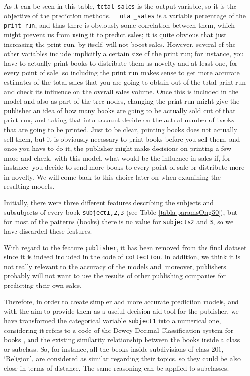 \documentclass[a4paper,10pt,twocolumn,preprint,3p]{elsarticle}
\begin{document}
As it can be seen in this table, \texttt{total\_sales} is the output
variable, so it is the objective of the prediction methods. {\tt
 total\_sales} is a variable percentage of the {\tt print\_run}, and
thus there is obviously some correlation between them, which might
prevent us from using it to predict sales; it is quite obvious that
just increasing the print run, by itself, will not boost
sales. However, several of the other variables include implicitly a
certain size of the print run; for instance, you have to actually
print books to distribute them as novelty and at least one, for every
point of sale, so including the print run makes sense to get more
accurate estimates of the total sales that you are going to obtain out
of the total print run and check its influence on the overall sales
volume. Once this is included in the model and also as part of the
tree nodes, changing the print run might give the publisher an idea of
how many books are going to be actually sold out of that print run,
and taking that into account decide on the actual number of books that
are going to be printed. Just to be clear, printing books does not
actually sell them, but it is obviously necessary to print books
before you sell them, and once you have to do it, the publisher might
make decisions on printing a few more and check, with this model, what
would be the influence in sales if, for instance, you decide to send
more books to every point of sale or distribute more in novelty. We 
will come back to this choice later on when examining the resulting
models. 

Initially, there were three different features describing the subjects
and subsubjects of every book \texttt{subject1,2,3} (see Table
\ref{tabla:paramsOrig50}), but for most of the patterns (books) there
is no value for \texttt{subjects2} and \texttt{3}, so we have discarded 
these features.   

With regard to the feature \texttt{publisher}, it has been removed from the 
final dataset since it is indeed included in the code of \texttt{collection}. 
In addition, we think it is not really relevant to the accuracy of the models 
and, moreover, publishers probably will not want to use the results of other 
publishing companies for predicting their own sales.

Therefore, in order to create simpler and more accurate prediction
models, and with the aim to provide them as a useful decision-aid tool
for the publisher, we have transformed the categorical variable
\texttt{subject1} into a numerical one, considering it refers to a
code of the Dewey Decimal Classification system for books
\cite{wiki:dewey}, and the existing similarity relationship between
the books inside a class or subclass. So, for instance, all the books
inside subdivisions of class 200, `Religion', are considered as
similar regarding their topics, so they could be also close in terms
of distance. The same reasoning can be applied to subclasses. 
\end{document}
